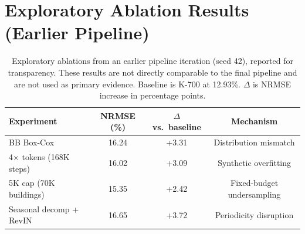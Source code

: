 \documentclass[preprint,12pt,authoryear]{elsarticle}
\begin{document}
\FloatBarrier
\section{Exploratory Ablation Results (Earlier Pipeline)}
\label{app:ablations}

\begin{table}[H]
\centering
\begin{tabular}{lccc}
\toprule
Experiment & NRMSE (\%) & $\Delta$ vs.\ baseline & Mechanism \\
\midrule
BB Box-Cox & 16.24 & +3.31 & Distribution mismatch \\
4$\times$ tokens (168K steps) & 16.02 & +3.09 & Synthetic overfitting \\
5K cap (70K buildings) & 15.35 & +2.42 & Fixed-budget undersampling \\
Seasonal decomp + RevIN & 16.65 & +3.72 & Periodicity disruption \\
\bottomrule
\end{tabular}
\caption{Exploratory ablations from an earlier pipeline iteration (seed 42), reported for transparency. These results are not directly comparable to the final pipeline and are not used as primary evidence. Baseline is K-700 at 12.93\%. $\Delta$ is NRMSE increase in percentage points.}
\label{tab:extra_ablations}
\end{table}
\end{document}
